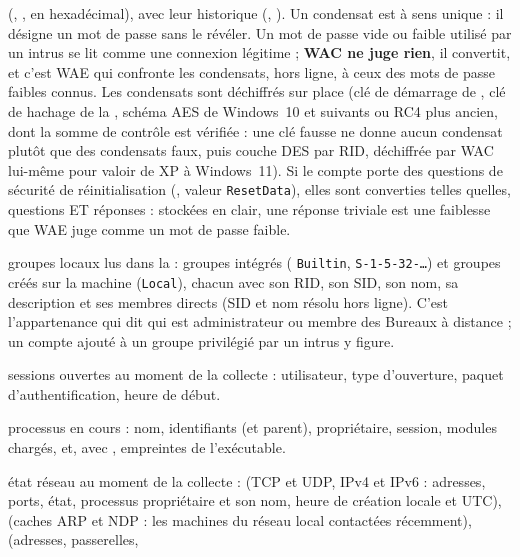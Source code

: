 \documentclass[11pt,a4paper,oneside]{report}
\begin{document}
\begin{description}[style=nextline,leftmargin=1.2em]
        (, , en hexadécimal), avec leur historique
        (, ). Un condensat est à sens
        unique : il désigne un mot de passe sans le révéler. Un mot de passe vide
        ou faible utilisé par un intrus se lit comme une connexion légitime ;
        \textbf{WAC ne juge rien}, il convertit, et c'est WAE qui confronte les
        condensats, hors ligne, à ceux des mots de passe faibles connus. Les
        condensats sont déchiffrés sur place (clé de démarrage de ,
        clé de hachage de la , schéma AES de Windows~10 et suivants
        ou RC4 plus ancien, dont la somme de contrôle est vérifiée : une clé
        fausse ne donne aucun condensat plutôt que des condensats faux, puis
        couche DES par RID, déchiffrée par WAC lui-même pour valoir de XP à
        Windows~11). Si le compte porte des
        questions de sécurité de réinitialisation (,
        valeur \texttt{ResetData}), elles sont converties telles quelles,
        questions ET réponses : stockées en clair, une réponse triviale est une
        faiblesse que WAE juge comme un mot de passe faible.
  \item[\fichier{local\_groups.json}] groupes locaux lus dans la  :
        groupes intégrés ( \texttt{Builtin}, \texttt{S-1-5-32-…}) et
        groupes créés sur la machine (\texttt{Local}), chacun avec son RID, son
        SID, son nom, sa description et ses membres directs (SID et nom résolu
        hors ligne). C'est l'appartenance qui dit qui est administrateur ou
        membre des Bureaux à distance ; un compte ajouté à un groupe privilégié
        par un intrus y figure.
  \item[\fichier{Sessions.json}] sessions ouvertes au moment de la collecte :
        utilisateur, type d'ouverture, paquet d'authentification, heure de début.
  \item[\fichier{processes.json}] processus en cours : nom, identifiants (et
        parent), propriétaire, session, modules chargés, et, avec ,
        empreintes de l'exécutable.
  \item[\fichier{network.json}] état réseau au moment de la collecte :
         (TCP et UDP, IPv4 et IPv6 : adresses, ports, état,
        processus propriétaire et son nom, heure de création locale et UTC),
         (caches ARP et NDP : les machines du réseau local
        contactées récemment),  (adresses, passerelles,

\end{description}
\end{document}
